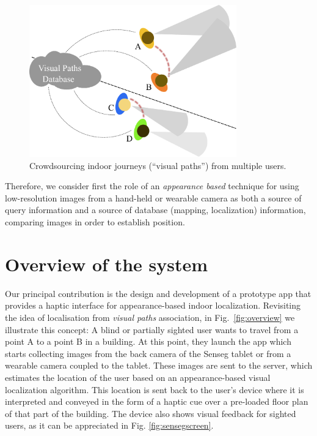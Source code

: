 \begin{figure}[h]
\centering
\includegraphics[width=0.8\textwidth]{gfx/Chapter06/AssociatingViews.pdf}
\caption{Crowdsourcing indoor journeys (``visual paths'') from multiple users.}
\label{fig:associatingViews}
\end{figure}

Therefore, we consider first the role of an {\em appearance based} technique for using low-resolution images from a hand-held or wearable camera as both a source of query information and a source of database (mapping, localization) information, comparing images in order to establish position. 

\section{Overview of the system}
\label{sec:overview}

Our principal contribution is the design and development of a prototype app that provides a haptic interface for appearance-based indoor localization. Revisiting the idea of localisation from \emph{visual paths} association, in Fig.~\ref{fig:overview} we illustrate this concept: A blind or partially sighted user wants to travel from a point A to a point B in a building. At this point, they launch the app which starts collecting images from the back camera of the Senseg tablet or from a wearable camera coupled to the tablet. These images are sent to the server, which estimates the location of the user based on an appearance-based visual localization algorithm. This location is sent back to the user's device where it is interpreted and conveyed in the form of a haptic cue over a pre-loaded floor plan of that part of the building. The device also shows visual feedback for sighted users, as it can be appreciated in Fig. \ref{fig:sensegscreen}.

